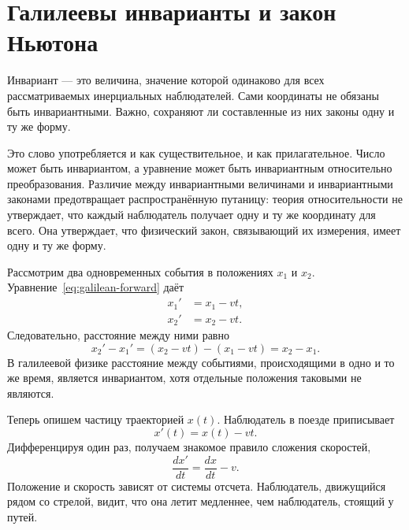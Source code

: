 \section{Галилеевы инварианты и закон Ньютона}

Инвариант — это величина, значение которой одинаково для всех рассматриваемых инерциальных наблюдателей. Сами координаты не обязаны быть инвариантными. Важно, сохраняют ли составленные из них законы одну и ту же форму.

Это слово употребляется и как существительное, и как прилагательное. Число может быть инвариантом, а уравнение может быть инвариантным относительно преобразования. Различие между инвариантными величинами и инвариантными законами предотвращает распространённую путаницу: теория относительности не утверждает, что каждый наблюдатель получает одну и ту же координату для всего. Она утверждает, что физический закон, связывающий их измерения, имеет одну и ту же форму.

Рассмотрим два одновременных события в положениях \(x_1\) и \(x_2\). Уравнение~\eqref{eq:galilean-forward} даёт
\begin{align}
x_1'&=x_1-vt,\\
x_2'&=x_2-vt.
\end{align}
Следовательно, расстояние между ними равно
\begin{equation}
x_2'-x_1'=(x_2-vt)-(x_1-vt)=x_2-x_1.
\end{equation}
В галилеевой физике расстояние между событиями, происходящими в одно и то же время, является инвариантом, хотя отдельные положения таковыми не являются.

\begin{classroomqa}
\end{classroomqa}

Теперь опишем частицу траекторией \(x(t)\). Наблюдатель в поезде приписывает
\begin{equation}
x'(t)=x(t)-vt.
\end{equation}
Дифференцируя один раз, получаем знакомое правило сложения скоростей,
\begin{equation}
\frac{dx'}{dt}=\frac{dx}{dt}-v.
\end{equation}
Положение и скорость зависят от системы отсчета. Наблюдатель, движущийся рядом со стрелой, видит, что она летит медленнее, чем наблюдатель, стоящий у путей.

